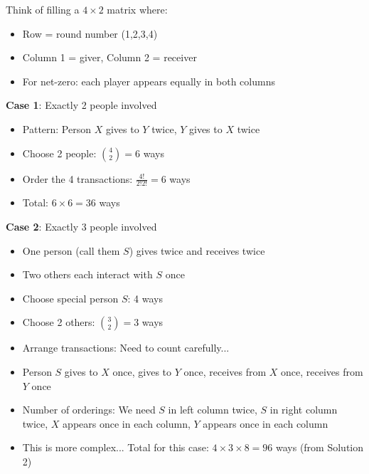\documentclass[]{article}
\begin{document}
\begin{solutionbox}
Think of filling a $4 \times 2$ matrix where:
\begin{itemize}
    \item Row = round number (1,2,3,4)
    \item Column 1 = giver, Column 2 = receiver
    \item For net-zero: each player appears equally in both columns
\end{itemize}

\textbf{Case 1}: Exactly 2 people involved
\begin{itemize}
    \item Pattern: Person $X$ gives to $Y$ twice, $Y$ gives to $X$ twice
    \item Choose 2 people: $\binom{4}{2} = 6$ ways
    \item Order the 4 transactions: $\frac{4!}{2!2!} = 6$ ways
    \item Total: $6 \times 6 = 36$ ways
\end{itemize}

\textbf{Case 2}: Exactly 3 people involved
\begin{itemize}
    \item One person (call them $S$) gives twice and receives twice
    \item Two others each interact with $S$ once
    \item Choose special person $S$: 4 ways
    \item Choose 2 others: $\binom{3}{2} = 3$ ways
    \item Arrange transactions: Need to count carefully...
    \item Person $S$ gives to $X$ once, gives to $Y$ once, receives from $X$ once, receives from $Y$ once
    \item Number of orderings: We need $S$ in left column twice, $S$ in right column twice, $X$ appears once in each column, $Y$ appears once in each column
    \item This is more complex... Total for this case: $4 \times 3 \times 8 = 96$ ways (from Solution 2)
\end{itemize}


\end{solutionbox}
\end{document}
